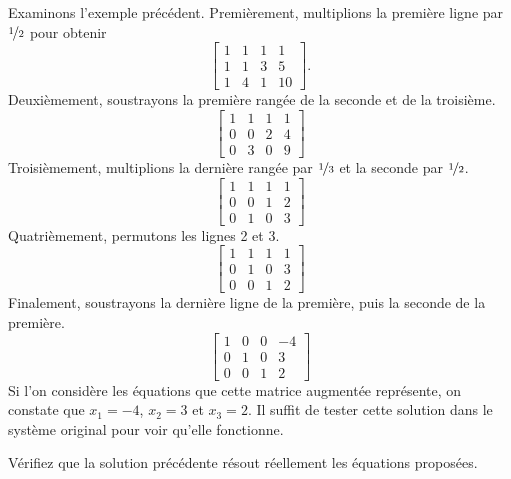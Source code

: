 Examinons l’exemple précédent. Premièrement, multiplions la première ligne par
$\nicefrac{1}{2}$ pour obtenir
\begin{equation*}
\left[
\begin{array}{ccc|c}
1 & 1 & 1 & 1 \\
1 & 1 & 3 & 5 \\
1 & 4 & 1 & 10
\end{array}
\right] .
\end{equation*}
Deuxièmement, soustrayons la première rangée de la seconde et de la troisième.
\begin{equation*}
\left[
\begin{array}{ccc|c}
1 & 1 & 1 & 1 \\
0 & 0 & 2 & 4 \\
0 & 3 & 0 & 9
\end{array}
\right]
\end{equation*}
Troisièmement, multiplions la dernière rangée par $\nicefrac{1}{3}$ et la seconde par $\nicefrac{1}{2}$.
\begin{equation*}
\left[
\begin{array}{ccc|c}
1 & 1 & 1 & 1 \\
0 & 0 & 1 & 2 \\
0 & 1 & 0 & 3
\end{array}
\right]
\end{equation*}
Quatrièmement, permutons les lignes 2 et 3.
\begin{equation*}
\left[
\begin{array}{ccc|c}
1 & 1 & 1 & 1 \\
0 & 1 & 0 & 3 \\
0 & 0 & 1 & 2
\end{array}
\right]
\end{equation*}
Finalement, soustrayons la dernière ligne de la première, puis  la seconde de la première.
\begin{equation*}
\left[
\begin{array}{ccc|c}
1 & 0 & 0 & -4 \\
0 & 1 & 0 & 3 \\
0 & 0 & 1 & 2
\end{array}
\right]
\end{equation*}
Si l'on considère les équations que cette matrice augmentée représente, on constate que
$x_1 = -4$, $x_2 = 3$ et $x_3 = 2$.  Il suffit de tester cette solution dans le système original pour voir qu’elle fonctionne.

\begin{exercise}
Vérifiez que la solution précédente résout réellement les équations proposées.
\end{exercise}

